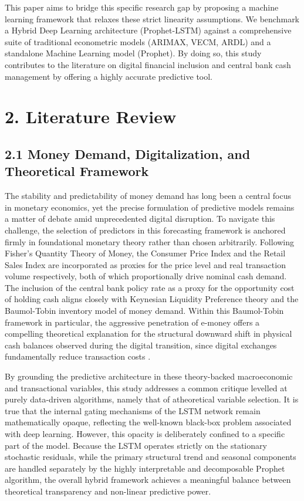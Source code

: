 \documentclass[12pt, letterpaper]{article}
\begin{document}
This paper aims to bridge this specific research gap by proposing a machine learning framework that relaxes these strict linearity assumptions. We benchmark a Hybrid Deep Learning architecture (Prophet-LSTM) against a comprehensive suite of traditional econometric models (ARIMAX, VECM, ARDL) and a standalone Machine Learning model (Prophet). By doing so, this study contributes to the literature on digital financial inclusion and central bank cash management by offering a highly accurate predictive tool.

\section*{2. Literature Review}
\subsection*{2.1 Money Demand, Digitalization, and Theoretical Framework}
The stability and predictability of money demand has long been a central focus in monetary economics, yet the precise formulation of predictive models remains a matter of debate amid unprecedented digital disruption. To navigate this challenge, the selection of predictors in this forecasting framework is anchored firmly in foundational monetary theory rather than chosen arbitrarily. Following Fisher's Quantity Theory of Money, the Consumer Price Index and the Retail Sales Index are incorporated as proxies for the price level and real transaction volume respectively, both of which proportionally drive nominal cash demand. The inclusion of the central bank policy rate as a proxy for the opportunity cost of holding cash aligns closely with Keynesian Liquidity Preference theory and the Baumol-Tobin inventory model of money demand. Within this Baumol-Tobin framework in particular, the aggressive penetration of e-money offers a compelling theoretical explanation for the structural downward shift in physical cash balances observed during the digital transition, since digital exchanges fundamentally reduce transaction costs \citep{Awasthy2022, Komurcuoglu2024}.

By grounding the predictive architecture in these theory-backed macroeconomic and transactional variables, this study addresses a common critique levelled at purely data-driven algorithms, namely that of atheoretical variable selection. It is true that the internal gating mechanisms of the LSTM network remain mathematically opaque, reflecting the well-known black-box problem associated with deep learning. However, this opacity is deliberately confined to a specific part of the model. Because the LSTM operates strictly on the stationary stochastic residuals, while the primary structural trend and seasonal components are handled separately by the highly interpretable and decomposable Prophet algorithm, the overall hybrid framework achieves a meaningful balance between theoretical transparency and non-linear predictive power.
\end{document}
